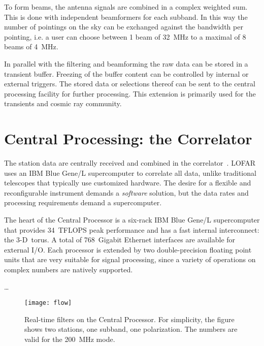 \documentclass[journal]{IEEEtran}
\begin{document}
To form beams, the antenna signals are combined in a complex weighted sum. This is done with independent beamformers for each subband. In this way the number of pointings on the sky can be exchanged against the bandwidth per pointing, i.e. a user can choose between 1 beam of 32~MHz to a maximal of 8 beams of 4~MHz.


In parallel with the filtering and beamforming the raw data can be stored in a transient buffer. Freezing of the buffer content can be controlled by internal or external triggers. The stored data or selections thereof can be sent to the central processing facility for further processing. This extension is primarily used for the transients and cosmic ray community.

\section{Central Processing: the Correlator}

The station data are centrally received and combined in the
correlator~\cite{Romein:06}.
LOFAR uses an IBM Blue Gene/L supercomputer to correlate all data,
unlike traditional telescopes that typically use customized hardware.
The desire for a flexible and reconfigurable instrument demands a
{\em software\/} solution, but the data rates and processing requirements
demand a supercomputer.

The heart of the Central Processor is a six-rack IBM Blue Gene/L supercomputer
that provides 34~TFLOPS peak performance and has a fast internal interconnect:
the 3-D~torus.
A total of 768~Gigabit Ethernet interfaces are available for external I/O.
Each processor is extended by two double-precision floating point units
that are very suitable for signal processing, since a variety of operations
on complex numbers are natively supported.


\ldots

\begin{figure*}
\texttt{[image: flow]}
\caption{Real-time filters on the Central Processor.  For simplicity, the
figure shows two stations, one subband, one polarization.  The numbers are
valid for the 200~MHz mode.}
\label{fig:flow}
\end{figure*}
\end{document}
